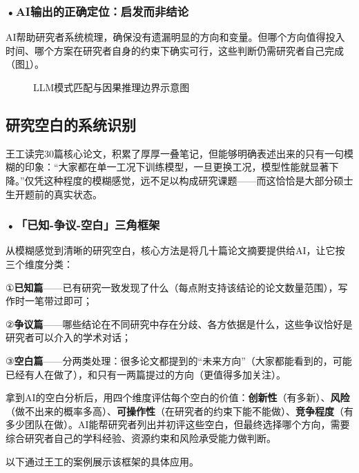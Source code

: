\subsubsection*{\textbf{•AI输出的正确定位：启发而非结论}}AI帮助研究者系统梳理，确保没有遗漏明显的方向和变量。但哪个方向值得投入时间、哪个方案在研究者自身的约束下确实可行，这些判断仍需研究者自己完成（图\ref{fig:ch5_05}）。

\begin{figure}[H]
\centering
{}
\caption{LLM模式匹配与因果推理边界示意图}
\label{fig:ch5_05}
\end{figure}
\par

\subsection{研究空白的系统识别}

王工读完30篇核心论文，积累了厚厚一叠笔记，但能够明确表述出来的只有一句模糊的印象：``大家都在单一工况下训练模型，一旦更换工况，模型性能就显著下降。''仅凭这种程度的模糊感觉，远不足以构成研究课题——而这恰恰是大部分硕士生开题前的真实状态。

\subsubsection*{\textbf{•「已知-争议-空白」三角框架}}从模糊感觉到清晰的研究空白，核心方法是将几十篇论文摘要提供给AI，让它按三个维度分类：

①\textbf{已知篇}——已有研究一致发现了什么（每点附支持该结论的论文数量范围），写作时一笔带过即可；

②\textbf{争议篇}——哪些结论在不同研究中存在分歧、各方依据是什么，这些争议恰好是研究者可以介入的学术对话；

③\textbf{空白篇}——分两类处理：很多论文都提到的``未来方向''（大家都能看到的，可能已经有人在做了），和只有一两篇提过的方向（更值得多加关注）。

拿到AI的空白分析后，用四个维度评估每个空白的价值：\textbf{创新性}（有多新）、\textbf{风险}（做不出来的概率多高）、\textbf{可操作性}（在研究者的约束下能不能做）、\textbf{竞争程度}（有多少团队在做）。AI能帮研究者列出并初评这些空白，但最终选择哪个方向，需要综合研究者自己的学科经验、资源约束和风险承受能力做判断。

以下通过王工的案例展示该框架的具体应用。

